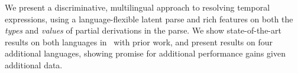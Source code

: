 We present a discriminative, multilingual approach to resolving
  temporal expressions, using a language-flexible latent parse and rich
  features on both the \textit{types} and \textit{values} of partial
  derivations in the parse.
We show state-of-the-art results on both languages in \tempeval\ with prior
  work, and present results on four additional languages, showing promise for
  additional performance gains given additional data.
